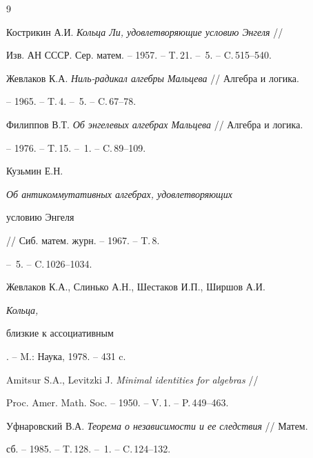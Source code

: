 \begin{thebibliography}{9} 


 




Кострикин А.И. {\em Кольца Ли, удовлетворяющие условию Энгеля} // 


Изв. АН СССР. Сер. матем. -- 1957. -- T.\,21. -- \No\,5. -- C.\,515--540. 




Жевлаков К.А. {\em Ниль-радикал алгебры Мальцева} // Алгебра и логика. 


-- 1965. -- T.\,4. -- \No\,5. -- C.\,67--78. 




Филиппов В.Т. {\em Об энгелевых алгебрах Мальцева} // Алгебра и логика. 


-- 1976. -- T.\,15. -- \No\,1. -- C.\,89--109. 




Кузьмин Е.Н. {\em Об антикоммутативных алгебрах, удовлетворяющих 


условию Энгеля} // Сиб. матем. журн. -- 1967. -- T.\,8. 


-- \No\,5. -- C.\,1026--1034. 




Жевлаков К.А., Слинько А.Н., Шестаков И.П., Ширшов А.И. {\em Кольца, 


близкие к ассоциативным}. -- M.: Наука, 1978. -- 431 c. 




Amitsur S.A., Levitzki J. {\em Minimal identities for algebras} // 


Proc. Amer. Math. Soc. -- 1950. -- V.\,1. -- P.\,449--463. 




Уфнаровский В.А. {\em Теорема о независимости и ее следствия} // Матем. 


сб. -- 1985. -- T.\,128. -- \No\,1. -- C.\,124--132. 


 


\end{thebibliography} 


 


\vskip 2cm 


 






 


\label{end} 


 



